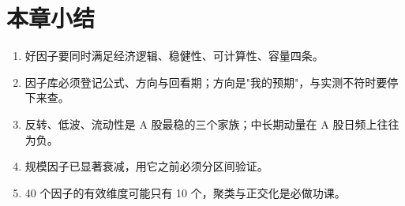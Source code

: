 \section{本章小结}

\begin{enumerate}
  \item 好因子要同时满足经济逻辑、稳健性、可计算性、容量四条。
  \item 因子库必须登记公式、方向与回看期；方向是"我的预期"，与实测不符时要停下来查。
  \item 反转、低波、流动性是 A 股最稳的三个家族；中长期动量在 A 股日频上往往为负。
  \item 规模因子已显著衰减，用它之前必须分区间验证。
  \item 40 个因子的有效维度可能只有 10 个，聚类与正交化是必做功课。
\end{enumerate}
